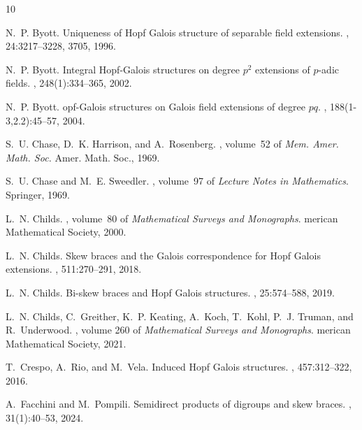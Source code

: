 \documentclass[12pt,a4paper, reqno]{amsart}
\theoremstyle{definition}
\begin{document}
%

\begin{thebibliography}{10}

N.~P. Byott.
\newblock Uniqueness of {H}opf {G}alois structure of separable field
  extensions.
, 24:3217--3228, 3705, 1996.

N.~P. Byott.
\newblock Integral {H}opf-{G}alois structures on degree $p^2$ extensions of
  $p$-adic fields.
, 248(1):334--365, 2002.

N.~P. Byott.
opf-{G}alois structures on {G}alois field extensions of degree
  $pq$.
, 188(1-3,2.2):45--57, 2004.

S.~U. Chase, D.~K. Harrison, and A.~Rosenberg.
,
  volume~52 of {\em Mem. Amer. Math. Soc.}
\newblock Amer. Math. Soc., 1969.

S.~U. Chase and M.~E. Sweedler.
, volume~97 of {\em Lecture
  Notes in Mathematics}.
\newblock Springer, 1969.

L.~N. Childs.
, volume~80 of {\em Mathematical Surveys and Monographs}.
merican Mathematical Society, 2000.

L.~N. Childs.
\newblock Skew braces and the {G}alois correspondence for {H}opf {G}alois
  extensions.
, 511:270--291, 2018.

L.~N. Childs.
\newblock Bi-skew braces and {H}opf {G}alois structures.
, 25:574--588, 2019.

L.~N. Childs, C.~Greither, K.~P. Keating, A.~Koch, T.~Kohl, P.~J. Truman, and
  R.~Underwood.
, volume 260 of {\em
  Mathematical Surveys and Monographs}.
merican Mathematical Society, 2021.

T.~Crespo, A.~Rio, and M.~Vela.
\newblock Induced {H}opf {G}alois structures.
, 457:312--322, 2016.

A.~Facchini and M.~Pompili.
\newblock Semidirect products of digroups and skew braces.
, 31(1):40--53, 2024.


\end{thebibliography}
\end{document}
